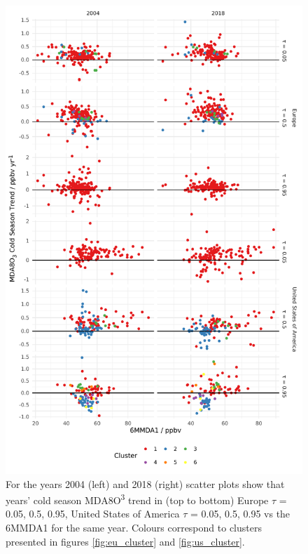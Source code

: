 \documentclass[journal abbreviation, manuscript]{copernicus}
\begin{document}
\begin{figure}[p]
\centering
\includegraphics[height=0.9\textheight]{figures/paper_figures/f11_mda8_cold_cluster_mda8_6mmda1.pdf}
\caption{For the years 2004 (left) and 2018 (right) scatter plots show that years' cold season MDA8O\textsuperscript{3} trend in (top to bottom) Europe $\tau$ = 0.05, 0.5, 0.95, United States of America $\tau$ = 0.05, 0.5, 0.95 vs the 6MMDA1 for the same year. Colours correspond to clusters presented in figures \ref{fig:eu_cluster} and \ref{fig:us_cluster}.}
\label{fig:mda8_cold_cluster_mda8_6mmda1}
\end{figure}
\clearpage



\end{document}
